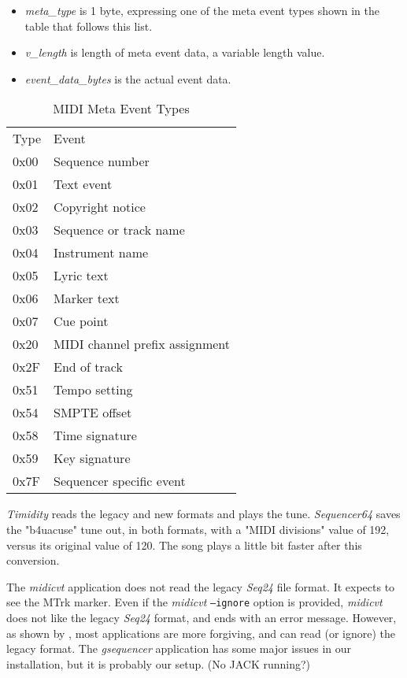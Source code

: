    \begin{itemize}
      \item \textsl{meta\_type} is 1 byte, expressing one of the meta event
         types shown in the table that follows this list.
      \item \textsl{v\_length} is length of meta event data, a variable
         length value.
      \item \textsl{event\_data\_bytes} is the actual event data.
   \end{itemize}

   \begin{table}
      \centering
      \caption{MIDI Meta Event Types}
      \label{table:midi_meta_event_types}
      \begin{tabular}{l l}
         Type	& Event \\
         0x00	& Sequence number \\
         0x01	& Text event \\
         0x02	& Copyright notice \\
         0x03	& Sequence or track name \\
         0x04	& Instrument name \\
         0x05	& Lyric text \\
         0x06	& Marker text \\
         0x07	& Cue point \\
         0x20	& MIDI channel prefix assignment \\
         0x2F	& End of track \\
         0x51	& Tempo setting \\
         0x54	& SMPTE offset \\
         0x58	& Time signature \\
         0x59	& Key signature \\
         0x7F	& Sequencer specific event \\
      \end{tabular}
   \end{table}

   \textsl{Timidity} reads the legacy and new formats and plays the tune.
   \textsl{Sequencer64}  saves the "b4uacuse" tune out, in both formats,
   with a "MIDI divisions" value of 192, versus its original value of 120.
   The song plays a little bit faster after this conversion.

   The \textsl{midicvt} application does not read the legacy \textsl{Seq24}
   file format.  It
   expects to see the MTrk marker.  Even if the \textsl{midicvt}
   \texttt{--ignore} option is provided,
   \textsl{midicvt} does not like the legacy \textsl{Seq24} format, and ends
   with an error message.
   However, as shown by ,
   most applications are more
   forgiving, and can read (or ignore) the legacy format.  The
   \textsl{gsequencer} application has some major issues in our
   installation, but it is probably our setup.  (No JACK running?)

